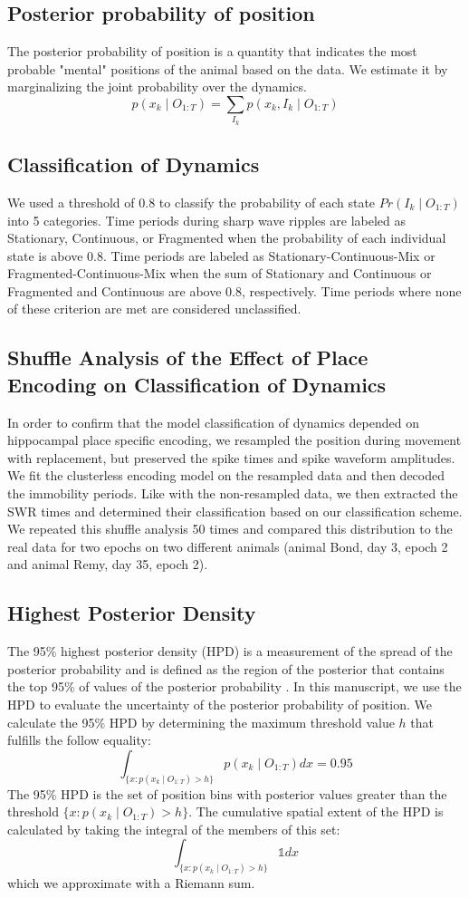 \documentclass[times, twoside]{zHenriquesLab-StyleBioRxiv}
\begin{document}
\subsection*{Posterior probability of position}
The posterior probability of position is a quantity that indicates the most probable "mental" positions of the animal based on the data. We estimate it by marginalizing the joint probability over the dynamics.
$$p(x_{k} \mid O_{1:T}) = \sum_{I_{k}} p(x_{k}, I_{k} \mid O_{1:T})$$

\subsection*{Classification of Dynamics}
We used a threshold of 0.8 to classify the probability of each state $Pr(I_{k} \mid O_{1:T})$ into 5 categories. Time periods during sharp wave ripples are labeled as Stationary, Continuous, or Fragmented when the probability of each individual state is above 0.8. Time periods are labeled as Stationary-Continuous-Mix or Fragmented-Continuous-Mix when the sum of Stationary and Continuous or Fragmented and Continuous are above 0.8, respectively. Time periods where none of these criterion are met are considered unclassified.

\subsection*{Shuffle Analysis of the Effect of Place Encoding on Classification of Dynamics}
In order to confirm that the model classification of dynamics depended on hippocampal place specific encoding, we resampled the position during movement with replacement, but preserved the spike times and spike waveform amplitudes. We fit the clusterless encoding model on the resampled data and then decoded the immobility periods. Like with the non-resampled data, we then extracted the SWR times and determined their classification based on our classification scheme. We repeated this shuffle analysis 50 times and compared this distribution to the real data for two epochs on two different animals (animal Bond, day 3, epoch 2 and animal Remy, day 35, epoch 2).

\subsection*{Highest Posterior Density}
The 95\% highest posterior density (HPD) is a measurement of the spread of the posterior probability and is defined as the region of the posterior that contains the top 95\% of values of the posterior probability \cite{CasellaStatisticalinference2001}. In this manuscript, we use the HPD to evaluate the uncertainty of the posterior probability of position. We calculate the 95\% HPD by determining the maximum threshold value $h$ that fulfills the follow equality:
$$
\int_{\{x: p(x_{k} \mid O_{1:T}) > h\}} p(x_{k} \mid O_{1:T})dx = 0.95
$$
The 95\% HPD is the set of position bins with posterior values greater than the threshold $\{x : p(x_{k} \mid O_{1:T}) > h\}$. The cumulative spatial extent of the HPD is calculated by taking the integral of the members of this set:
$$
\int_{\{x: p(x_{k} \mid O_{1:T}) > h\}} \mathbb{1}dx
$$
which we approximate with a Riemann sum.
\end{document}
